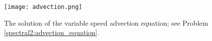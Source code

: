 \begin{figure}
\centering
\texttt{[image: advection.png]}
\caption{The solution of the variable speed advection equation; see Problem \ref{spectral2:advection_equation}.}
\label{fig:spectral:spectral2_advection}
\end{figure}